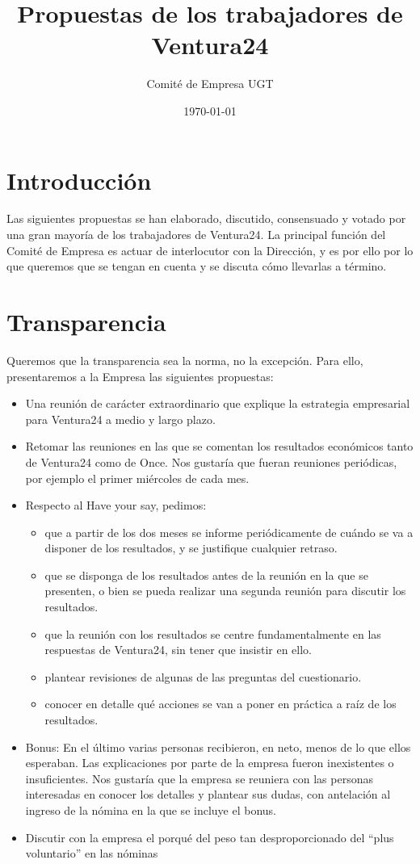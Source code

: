 \documentclass[11pt]{article}
\author{Comité de Empresa UGT}
\date{\today}
\title{Propuestas de los trabajadores de Ventura24}
\begin{document}
\maketitle
\tableofcontents

\section{Introducción}
\label{sec-1}
Las siguientes propuestas se han elaborado, discutido, consensuado y votado por una gran mayoría de los trabajadores de Ventura24.
La principal función del Comité de Empresa es actuar de interlocutor con la Dirección, y es por ello por lo que queremos que se tengan en cuenta y se discuta cómo llevarlas a término.
\section{Transparencia}
\label{sec-2}
Queremos que la transparencia sea la norma, no la excepción.
Para ello, presentaremos a la Empresa las siguientes propuestas:
\begin{itemize}
\item Una reunión de carácter extraordinario que explique la estrategia empresarial para Ventura24 a medio y largo plazo.
\item Retomar las reuniones en las que se comentan los resultados económicos tanto de Ventura24 como de Once. Nos gustaría que fueran reuniones periódicas, por ejemplo el primer miércoles de cada mes.
\item Respecto al Have your say, pedimos:
\begin{itemize}
\item que a partir de los dos meses se informe periódicamente de cuándo se va a disponer de los resultados, y se justifique cualquier retraso.
\item que se disponga de los resultados antes de la reunión en la que se presenten, o bien se pueda realizar una segunda reunión para discutir los resultados.
\item que la reunión con los resultados se centre fundamentalmente en las respuestas de Ventura24, sin tener que insistir en ello.
\item plantear revisiones de algunas de las preguntas del cuestionario.
\item conocer en detalle qué acciones se van a poner en práctica a raíz de los resultados.
\end{itemize}
\item Bonus: En el último varias personas recibieron, en neto, menos de lo que ellos esperaban. Las explicaciones por parte de la empresa fueron inexistentes o insuficientes. Nos gustaría que la empresa se reuniera con las personas interesadas en conocer los detalles y plantear sus dudas, con antelación al ingreso de la nómina en la que se incluye el bonus.
\item Discutir con la empresa el porqué del peso tan desproporcionado del “plus voluntario” en las nóminas
\end{itemize}
\end{document}
